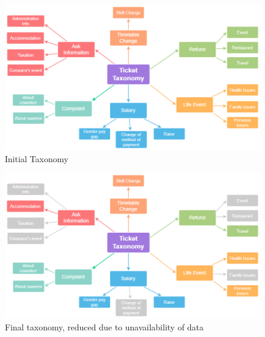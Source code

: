 \begin{figure}[h] 
    \includegraphics[width=\textwidth]{images/Taxonomy_Tickets.drawio.png}
    \caption{Initial Taxonomy}
    \label{fig:taxonomy}
\end{figure}    

\begin{figure}[h] 
    \includegraphics[width=\textwidth]{images/Taxonomy_Tickets_implemented.drawio.png}
    \caption{Final taxonomy, reduced due to unavailability of data}
    \label{fig:final_taxonomy}
\end{figure}    


